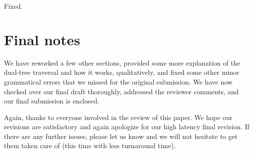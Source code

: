 \documentclass[twoside,11pt]{article}
\begin{document}
Fixed.

\section{Final notes}

We have reworked a few other sections, provided some more explanation of the
dual-tree traversal and how it works, qualitatively, and fixed some other
minor grammatical errors that we missed for the original submission.  We have
now checked over our final draft thoroughly, addressed the reviewer comments,
and our final submission is enclosed.

Again, thanks to everyone involved in the review of this paper.  We hope our
revisions are satisfactory and again apologize for our high latency final
revision.  If there are any further issues, please let us know and we will not
hesitate to get them taken care of (this time with less turnaround time).
\end{document}
